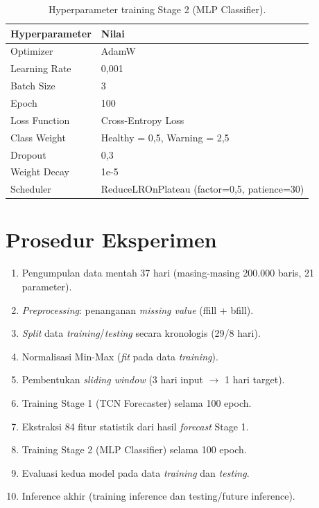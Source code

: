 \documentclass[12pt,a4paper]{report}
\begin{document}
\begin{table}[H]
    \centering
    \caption{Hyperparameter training Stage 2 (MLP Classifier).}
    \begin{tabular}{ll}
        \toprule
        \textbf{Hyperparameter} & \textbf{Nilai} \\
        \midrule
        Optimizer & AdamW \\
        Learning Rate & 0,001 \\
        Batch Size & 3 \\
        Epoch & 100 \\
        Loss Function & Cross-Entropy Loss \\
        Class Weight & Healthy = 0,5, Warning = 2,5 \\
        Dropout & 0,3 \\
        Weight Decay & 1e-5 \\
        Scheduler & ReduceLROnPlateau (factor=0,5, patience=30) \\
        \bottomrule
    \end{tabular}
\end{table}

\section{Prosedur Eksperimen}
\begin{enumerate}
    \item Pengumpulan data mentah 37 hari (masing-masing 200.000 baris, 21 parameter).
    \item \textit{Preprocessing}: penanganan \textit{missing value} (ffill + bfill).
    \item \textit{Split} data \textit{training}/\textit{testing} secara kronologis (29/8 hari).
    \item Normalisasi Min-Max (\textit{fit} pada data \textit{training}).
    \item Pembentukan \textit{sliding window} (3 hari input $\to$ 1 hari target).
    \item Training Stage 1 (TCN Forecaster) selama 100 epoch.
    \item Ekstraksi 84 fitur statistik dari hasil \textit{forecast} Stage 1.
    \item Training Stage 2 (MLP Classifier) selama 100 epoch.
    \item Evaluasi kedua model pada data \textit{training} dan \textit{testing}.
    \item Inference akhir (training inference dan testing/future inference).
\end{enumerate}
\end{document}
